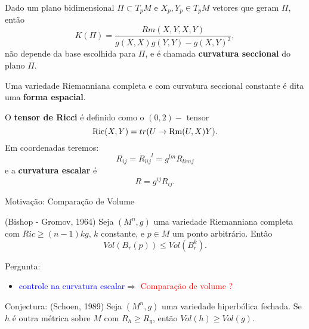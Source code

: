 \documentclass[blue]{beamer}
\begin{document}
\begin{frame}
Dado um plano bidimensional $\Pi\subset T_{p}M$ e $X_{p}, Y_{p}\in T_{p}M$ vetores que geram $\Pi$, então
\begin{equation}
K(\Pi)=\frac{Rm(X, Y, X, Y)}{g(X, X)g(Y, Y)-g(X, Y)^{2}},
\end{equation}
não depende da base escolhida para $\Pi$, e é chamada {\bf curvatura seccional} do plano $\Pi$. \pause 

Uma variedade Riemanniana completa e com curvatura seccional constante é dita uma {\bf forma espacial}.
\end{frame}

\begin{frame}
O \textbf{tensor de Ricci} é definido como o $(0,2)-$ tensor
\begin{equation*}
{\rm Ric}(X,Y)= tr(U \rightarrow {\rm Rm}(U,X)Y).
\end{equation*}
Em coordenadas teremos:
\begin{equation*}
R_{ij} = {R_{lij}}^{l}= g^{lm}R_{limj}
\end{equation*}
e a \textbf{curvatura escalar} é
\begin{equation*}
R = g^{ij}R_{ij}.
\end{equation*}
\end{frame}


\begin{frame}{Motivação: Comparação de Volume}\pause 
\begin{block}{(Bishop - Gromov, 1964)}
	Seja $(M^n, g)$ uma variedade Riemanniana completa com $Ric \geq (n-1)kg$, $k$ constante, e $p\in M$ um ponto arbitrário. Então
	$$Vol (B_{r}(p)) \leq Vol(B^{k}_{r}).$$ 
\end{block}\pause

Pergunta: \pause
\begin{itemize}
	\item \textcolor{blue}{controle na curvatura escalar}$ \Rightarrow $ \textcolor{red}{Comparação de volume ? 	}\pause
\end{itemize}

\begin{block}{Conjectura: (Schoen, 1989)}
	Seja $(M^n, g)$ uma variedade hiperbólica fechada. Se $h$ é outra métrica sobre $M$ com $R_{h}\geq R_{g}$, então $Vol(h) \geq Vol(g)$.
\end{block}

\end{frame}
\end{document}
